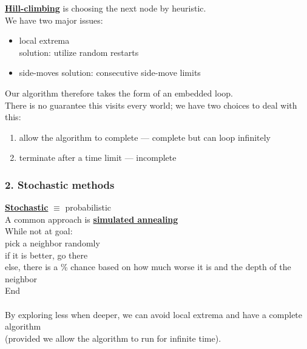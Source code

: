 \documentclass[../../lecture_notes.tex]{subfiles}
\begin{document}
\begin{center} \begin{minipage} {0.8\textwidth}
\textbf{\underline{Hill-climbing}} is choosing the next node by heuristic.\\
We have two major issues:
	\begin{itemize} [itemsep=0mm]
		\item local extrema\\
			solution: utilize random restarts
		\item side-moves
			solution: consecutive side-move limits
	\end{itemize}
Our algorithm therefore takes the form of an embedded loop.\\
\noindent There is no guarantee this visits every world; we have two choices to deal with this:
\begin{enumerate} [itemsep=0mm]
	\item allow the algorithm to complete — complete but can loop infinitely
	\item terminate after a time limit — incomplete
\end{enumerate}
\end{minipage}%
\begin{minipage}{0.2\textwidth}\end{minipage} \end{center} 

\subsubsection*{2. Stochastic methods}
\noindent \textbf{\underline{Stochastic}} $\equiv$ probabilistic\\
A common approach is \textbf{\underline{simulated annealing}}\\
While not at goal:\\
\indent pick a neighbor randomly\\
\indent if it is better, go there\\
\indent else, there is a \% chance based on how much worse it is and the depth of the neighbor\\
End\\
\\
By exploring less when deeper, we can avoid local extrema and have a complete algorithm\\ 
\indent (provided we allow the algorithm to run for infinite time).\\
\end{document}
